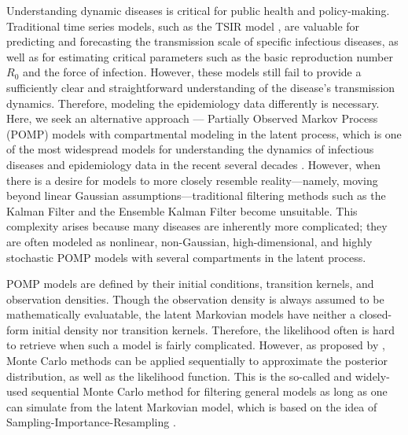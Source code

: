 \documentclass[10pt]{article}
\begin{document}
Understanding dynamic diseases is critical for public health and policy-making. Traditional time series models, such as the TSIR model \citep{TSIR1, TSIR_package}, are valuable for predicting and forecasting the transmission scale of specific infectious diseases, as well as for estimating critical parameters such as the basic reproduction number $R_0$ and the force of infection. However, these models still fail to provide a sufficiently clear and straightforward understanding of the disease's transmission dynamics. Therefore, modeling the epidemiology data differently is necessary. Here, we seek an alternative approach --- Partially Observed Markov Process (POMP) models with compartmental modeling in the latent process, which is one of the most widespread models for understanding the dynamics of infectious diseases and epidemiology data in the recent several decades \citep{mseh, HULIN2000197, daihai, plospomp, stocks, wastewater, daihai2,wwr}. However, when there is a desire for models to more closely resemble reality—namely, moving beyond linear Gaussian assumptions—traditional filtering methods such as the Kalman Filter \citep{kalman1960} and the Ensemble Kalman Filter \citep{ensembkal, ensemkalman2} become unsuitable. This complexity arises because many diseases are inherently more complicated; they are often modeled as nonlinear, non-Gaussian, high-dimensional, and highly stochastic POMP models with several compartments in the latent process. 


POMP models are defined by their initial conditions, transition kernels, and observation densities. Though the observation density is always assumed to be mathematically evaluatable, the latent Markovian models have neither a closed-form initial density nor transition kernels. Therefore, the likelihood often is hard to retrieve when such a model is fairly complicated. However, as proposed by \cite{Kitagawa1987-fr, gordon1993, Kitagawa1996-wa}, Monte Carlo methods can be applied sequentially to approximate the posterior distribution, as well as the likelihood function. This is the so-called and widely-used sequential Monte Carlo method for filtering general models as long as one can simulate from the latent Markovian model, which is based on the idea of Sampling-Importance-Resampling \citep{Rubin1987}. 
\end{document}
